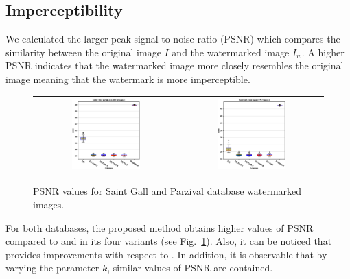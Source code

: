 \documentclass[runningheads]{llncs}
\begin{document}
\subsection{Imperceptibility}
We calculated the larger peak signal-to-noise ratio (PSNR) which compares the similarity between the original image $ I $ and the watermarked image $ I_w $. A higher PSNR indicates that the watermarked image more closely resembles the original image meaning that the watermark is more imperceptible.
\begin{figure}[H]
	\begin{center}
		\begin{tabular}{|c|c|}\hline
			\includegraphics[width=0.5\textwidth]{PSNR_saintgall.eps}
			&\includegraphics[width=0.5\textwidth]{PSNR_parzival.eps}\\\hline
		\end{tabular}
	\end{center}
	\caption{PSNR values for Saint Gall and Parzival database watermarked images.}
	\label{psnr}
\end{figure}
For both databases, the proposed method obtains higher values of PSNR compared to \cite{shivani2017dual} and \cite{liu2018blind} in its four variants (see Fig.~\ref{psnr}). Also, it can be noticed that \cite{shivani2017dual} provides improvements with respect to \cite{liu2018blind}. In addition, it is observable that by varying the parameter $k$, similar values of PSNR are contained.  
\end{document}
